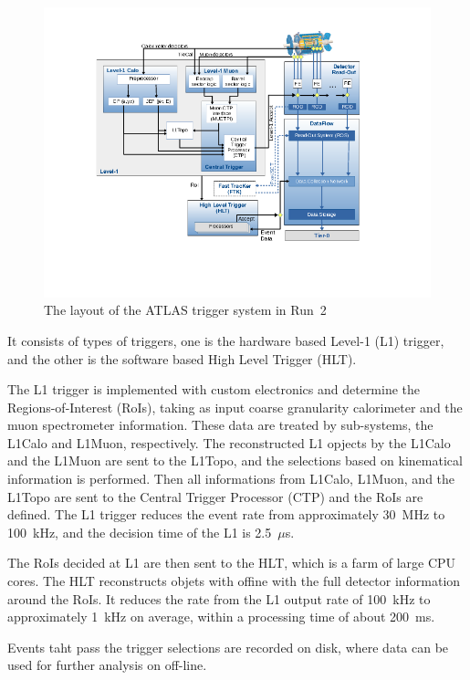 \begin{figure}[tbp]
\begin{center}
 \includegraphics[width=1.0\textwidth,keepaspectratio]{figures/detector/Trigger}
\caption{
The layout of the ATLAS trigger system in Run~2
}
\label{fig:Trigger}
\end{center}
\end{figure}

It consists of types of triggers, one is the hardware based Level-1 (L1) trigger, and the other is the software based High Level Trigger (HLT). 

The L1 trigger is implemented with custom electronics and determine the Regions-of-Interest (RoIs), taking as input coarse granularity calorimeter and the muon spectrometer information. These data are treated by sub-systems, the L1Calo and L1Muon, respectively. The reconstructed L1 opjects by the L1Calo and the L1Muon are sent to the L1Topo, and  the selections based on kinematical information is performed. Then all informations from L1Calo, L1Muon, and the L1Topo are sent to the Central Trigger Processor (CTP) and the RoIs are defined. The L1 trigger reduces the event rate from approximately 30~MHz to 100~kHz, and the decision time of the L1 is  2.5~$\mu$s.

The RoIs decided at L1 are then sent to the HLT, which is a farm of large CPU cores.
The HLT reconstructs objets with offine with the full detector information around the RoIs. 
It reduces the rate from the L1 output rate of 100~kHz to approximately 1~kHz on average, within a processing time of about 200~ms.

Events taht pass the trigger selections are recorded on disk, where data can be used for further analysis on off-line.

